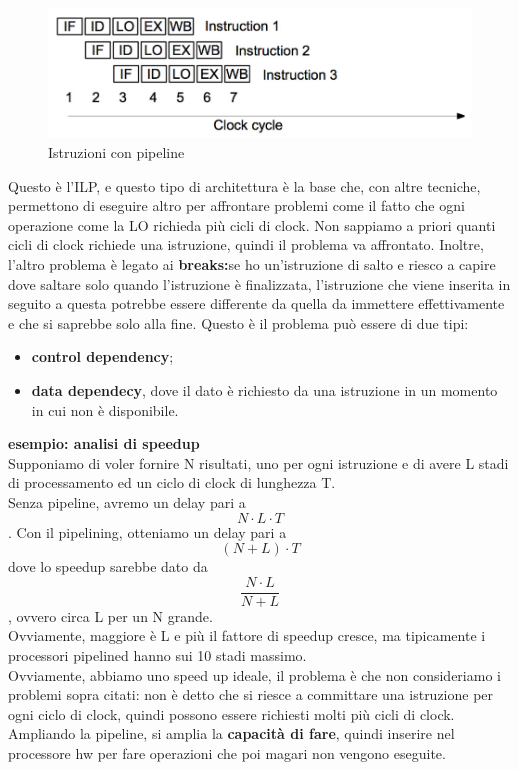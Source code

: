 \documentclass[14pt, oneside]{book}
\begin{document}
\begin{figure}[ht!]
\includegraphics[scale=0.3]{immagini/pipeline}
\caption{Istruzioni con pipeline}
\end{figure}
Questo è l'ILP, e questo tipo di architettura è la base che, con altre tecniche, permettono di eseguire altro per affrontare problemi come il fatto che ogni operazione come la LO richieda più cicli di clock. Non sappiamo a priori quanti cicli di clock richiede una istruzione, quindi il problema va affrontato. Inoltre, l'altro problema è legato ai \textbf{breaks:}se ho un'istruzione di salto e riesco a capire dove saltare solo quando l'istruzione è finalizzata, l'istruzione che viene inserita in seguito a questa potrebbe essere differente da quella da immettere effettivamente e che si saprebbe solo alla fine. Questo è il problema può essere di due tipi:
\begin{itemize}
\item \textbf{control dependency};
\item \textbf{data dependecy}, dove il dato è richiesto da una istruzione in un momento in cui non è disponibile.
\end{itemize} 
\textbf{esempio: analisi di speedup}\\
Supponiamo di voler fornire N risultati, uno per ogni istruzione e di avere L stadi di processamento ed un ciclo di clock di lunghezza T.\\ Senza pipeline, avremo un delay pari a \[ N \cdot L \cdot T\]. Con il pipelining, otteniamo un delay pari a \[(N+L)\cdot T\] dove lo speedup sarebbe dato da \[\frac{N \cdot L}{N+L}\], ovvero circa L per un N grande.\\ Ovviamente, maggiore è L e più il fattore di speedup cresce, ma tipicamente i processori pipelined hanno sui 10 stadi massimo.\\ Ovviamente, abbiamo uno speed up ideale, il problema è che non consideriamo i problemi sopra citati: non è detto che si riesce a committare una istruzione per ogni ciclo di clock, quindi possono essere richiesti molti più cicli di clock. Ampliando la pipeline, si amplia la \textbf{capacità di fare}, quindi inserire nel processore hw per fare operazioni che poi magari non vengono eseguite.
\end{document}
